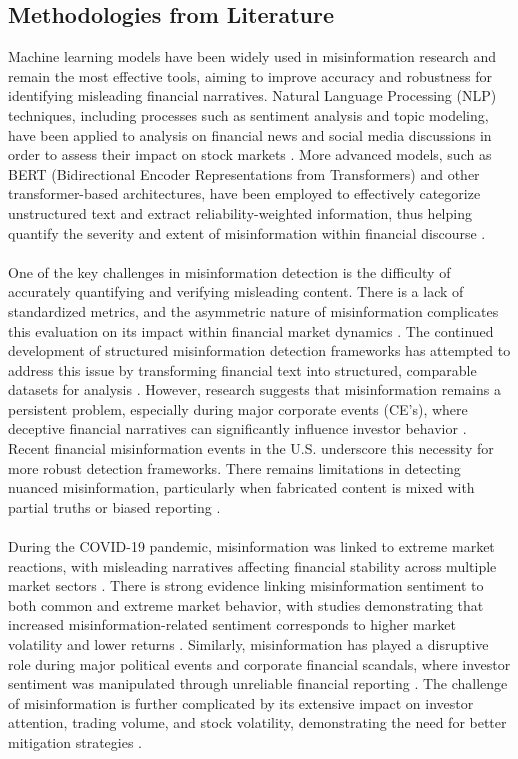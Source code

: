 \documentclass{article}
\begin{document}
\subsection{Methodologies from Literature}
Machine learning models have been widely used in misinformation research and remain the most effective tools, aiming to improve accuracy and robustness for identifying misleading financial narratives. Natural Language Processing (NLP) techniques, including processes such as sentiment analysis and topic modeling, have been applied to analysis on financial news and social media discussions in order to assess their impact on stock markets \cite{source21, source26, source30}. More advanced models, such as BERT (Bidirectional Encoder Representations from Transformers) and other transformer-based architectures, have been employed to effectively categorize unstructured text and extract reliability-weighted information, thus helping quantify the severity and extent of misinformation within financial discourse \cite{source30}. 
\\\\
One of the key challenges in misinformation detection is the difficulty of accurately quantifying and verifying misleading content. There is a lack of standardized metrics, and the asymmetric nature of misinformation complicates this evaluation on its impact within financial market dynamics \cite{source28, source30}. The continued development of structured misinformation detection frameworks has attempted to address this issue by transforming financial text into structured, comparable datasets for analysis \cite{source30}. However, research suggests that misinformation remains a persistent problem, especially during major corporate events (CE’s), where deceptive financial narratives can significantly influence investor behavior \cite{source30}. Recent financial misinformation events in the U.S. underscore this necessity for more robust detection frameworks. There remains limitations in detecting nuanced misinformation, particularly when fabricated content is mixed with partial truths or biased reporting \cite{source26, source28}. 
\\\\
During the COVID-19 pandemic, misinformation was linked to extreme market reactions, with misleading narratives affecting financial stability across multiple market sectors \cite{source29, source30}. There is strong evidence linking misinformation sentiment to both common and extreme market behavior, with studies demonstrating that increased misinformation-related sentiment corresponds to higher market volatility and lower returns \cite{source23}. Similarly, misinformation has played a disruptive role during major political events and corporate financial scandals, where investor sentiment was manipulated through unreliable financial reporting \cite{source30}. The challenge of misinformation is further complicated by its extensive impact on investor attention, trading volume, and stock volatility, demonstrating the need for better mitigation strategies \cite{source25, source30}.
\end{document}
